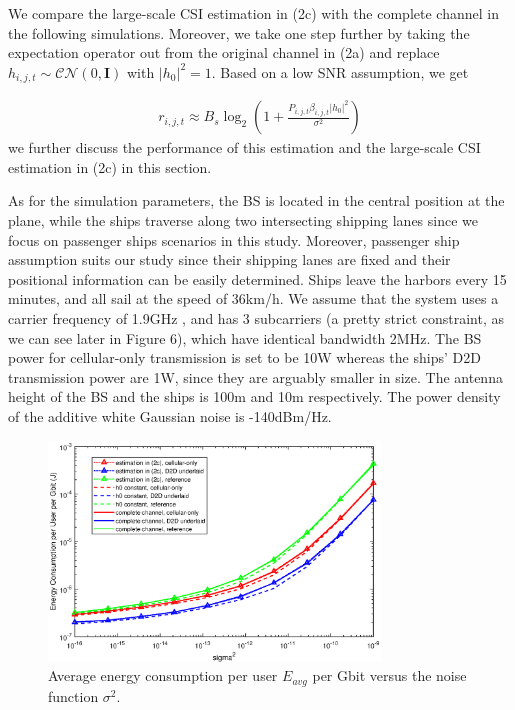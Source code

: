 \documentclass{ieeeaccess}
\begin{document}
We compare the large-scale CSI estimation in (2c) with the complete channel in the following simulations. Moreover, we take one step further by taking the expectation operator out from the original channel in (2a) and replace ${h_{i,j,t}} \sim \mathcal{CN}(0, \mathbf{I})$ with ${\left| {{h_0}} \right|^2} = 1$. Based on a low SNR assumption, we get 

\begin{align}
{r_{i,j,t}} \approx {B_s}{\log _2}\left( {1 + \frac{{{P_{i,j,t}}{\beta _{i,j,t}}{{\left| {{h_0}} \right|}^2}}}{{{\sigma ^2}}}} \right)
\end{align}
we further discuss the performance of this estimation and the large-scale CSI estimation in (2c) in this section.

As for the simulation parameters, the BS is located in the central position at the plane, while the ships traverse along two intersecting shipping lanes since we focus on passenger ships scenarios in this study. Moreover, passenger ship assumption suits our study since their shipping lanes are fixed and their positional information can be easily determined. Ships leave the harbors every 15 minutes, and all sail at the speed of 36km/h. We assume that the system uses a carrier frequency of 1.9GHz , and has 3 subcarriers (a pretty strict constraint, as we can see later in Figure 6), which have identical bandwidth 2MHz. The BS power for cellular-only transmission is set to be 10W whereas the ships' D2D transmission power are 1W, since they are arguably smaller in size. The antenna height of the BS and the ships is 100m and 10m respectively. The power density of the additive white Gaussian noise is -140dBm/Hz.


\begin{figure} [htb]
\includegraphics*[width=8.8cm]{sigma2s.eps}
\caption{Average energy consumption per user $E_{avg}$ per Gbit versus the noise function ${\sigma ^2}$.}\label{fig:2}
\end{figure}
\end{document}
